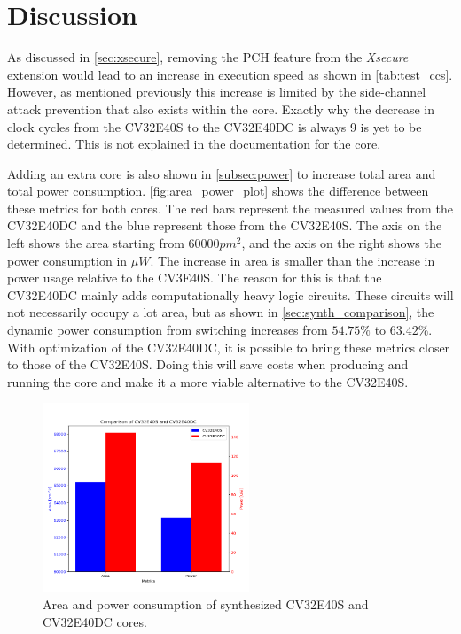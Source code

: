 \section{Discussion}
\label{sec:discussion}

As discussed in \autoref{sec:xsecure}, removing the PCH feature from the \textit{Xsecure} extension would lead to an increase in execution speed as shown in \autoref{tab:test_ccs}. However, as mentioned previously this increase is limited by the side-channel attack prevention that also exists within the core. Exactly why the decrease in clock cycles from the CV32E40S to the CV32E40DC is always 9 is yet to be determined. This is not explained in the documentation for the core.  

Adding an extra core is also shown in \autoref{subsec:power} to increase total area and total power consumption. \autoref{fig:area_power_plot} shows the difference between these metrics for both cores. The red bars represent the measured values from the CV32E40DC and the blue represent those from the CV32E40S. The axis on the left shows the area starting from 60000$pm^2$, and the axis on the right shows the power consumption in $\mu W$. The increase in area is smaller than the increase in power usage relative to the CV3E40S. The reason for this is that the CV32E40DC mainly adds computationally heavy logic circuits. These circuits will not necessarily occupy a lot area, but as shown in \autoref{sec:synth_comparison}, the dynamic power consumption from switching increases from $54.75\%$ to $63.42\%$. With optimization of the CV32E40DC, it is possible to bring these metrics closer to those of the CV32E40S. Doing this will save costs when producing and running the core and make it a more viable alternative to the CV32E40S. 

\begin{figure}[h!]
    \centering
    \includegraphics[width=0.55\textwidth]{docs/images/area_power_both_cores.png}
    \caption{Area and power consumption of synthesized CV32E40S and CV32E40DC cores. }
    \label{fig:area_power_plot}
\end{figure}

